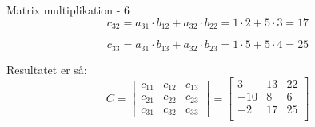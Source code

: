 \documentclass{article}
\begin{document}
\begin{exercise}{Matrix multiplikation - 6}
	\hint
	\[
		c_{32} = a_{31} \cdot b_{12} + a_{32} \cdot b_{22} = 1 \cdot 2 + 5 \cdot 3 = 17
	\]
	
	\hint
	\[
		c_{33} = a_{31} \cdot b_{13} + a_{32} \cdot b_{23} = 1 \cdot 5 + 5 \cdot 4 = 25
	\]	
	
	
	
	\hint
	Resultatet er så:
	\[
	C = \left[\begin{array}{rrr}
	c_{11} & c_{12} & c_{13} \\
	c_{21} & c_{22} & c_{23} \\
	c_{31} & c_{32} & c_{33}
	\end{array} \right] = 
	\left[\begin{array}{rrr}
	3 & 13 & 22 \\
	-10 & 8 & 6 \\
	-2 & 17 & 25 \\
	\end{array} \right]
	\]
	
	
\end{exercise}

\newpage
\end{document}

